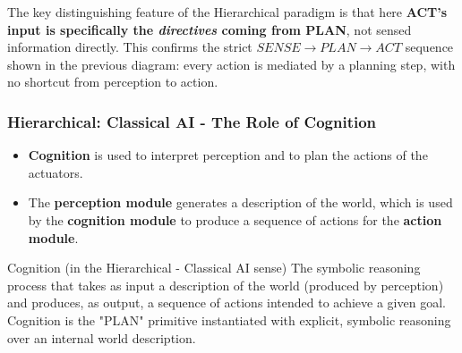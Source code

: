 \begin{center}
\end{center}

The key distinguishing feature of the Hierarchical paradigm  is that here \textbf{ACT's input is specifically the \textit{directives} coming from PLAN}, not sensed information directly. This confirms the strict $SENSE \rightarrow PLAN \rightarrow ACT$ sequence shown in the previous diagram: every action is mediated by a planning step, with no shortcut from perception to action.

\subsubsection{ Hierarchical: Classical AI - The Role of Cognition}

\begin{itemize}
    \item \textbf{Cognition} is used to interpret perception and to plan the actions of the actuators.
    \item The \textbf{perception module} generates a description of the world, which is used by the \textbf{cognition module} to produce a sequence of actions for the \textbf{action module}.
\end{itemize}

\begin{defbox}{Cognition (in the Hierarchical - Classical AI sense)}
The symbolic reasoning process that takes as input a description of the world (produced by perception) and produces, as output, a sequence of actions intended to achieve a given goal. Cognition is the "PLAN" primitive instantiated with explicit, symbolic reasoning over an internal world description.
\end{defbox}

